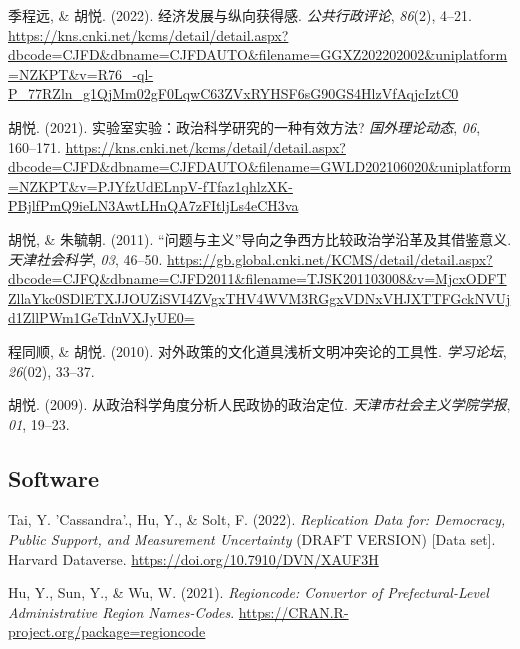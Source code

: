 \documentclass[11pt,a4paper,]{awesome-cv}
\begin{document}
\hypertarget{bibliography}{}
\leavevmode{}%
季程远, \& 胡悦. (2022). 经济发展与纵向获得感. \emph{公共行政评论},
\emph{86}(2), 4--21.
\url{https://kns.cnki.net/kcms/detail/detail.aspx?dbcode=CJFD\&dbname=CJFDAUTO\&filename=GGXZ202202002\&uniplatform=NZKPT\&v=R76_-ql-P_77RZln_g1QjMm02gF0LqwC63ZVxRYHSF6sG90GS4HlzVfAqjcIztC0}

\leavevmode{}%
胡悦. (2021). 实验室实验：政治科学研究的一种有效方法?
\emph{国外理论动态}, \emph{06}, 160--171.
\url{https://kns.cnki.net/kcms/detail/detail.aspx?dbcode=CJFD\&dbname=CJFDAUTO\&filename=GWLD202106020\&uniplatform=NZKPT\&v=PJYfzUdELnpV-fTfaz1qhlzXK-PBjlfPmQ9ieLN3AwtLHnQA7zFItljLs4eCH3va}

\leavevmode{}%
胡悦, \& 朱毓朝. (2011).
{``问题与主义''}导向之争西方比较政治学沿革及其借鉴意义.
\emph{天津社会科学}, \emph{03}, 46--50.
\url{https://gb.global.cnki.net/KCMS/detail/detail.aspx?dbcode=CJFQ\&dbname=CJFD2011\&filename=TJSK201103008\&v=MjcxODFTZllaYkc0SDlETXJJOUZiSVI4ZVgxTHV4WVM3RGgxVDNxVHJXTTFGckNVUjd1ZllPWm1GeTdnVXJyUE0=}

\leavevmode{}%
程同顺, \& 胡悦. (2010). 对外政策的文化道具浅析文明冲突论的工具性.
\emph{学习论坛}, \emph{26}(02), 33--37.

\leavevmode{}%
胡悦. (2009). 从政治科学角度分析人民政协的政治定位.
\emph{天津市社会主义学院学报}, \emph{01}, 19--23.

\endgroup

\hypertarget{software}{%
\subsection{Software}\label{software}}

\begingroup
\setlength{\parindent}{-0.5in}
\setlength{\leftskip}{0.5in}

\hypertarget{bibliography}{}
\leavevmode{}%
Tai, Y. 'Cassandra'., Hu, Y., \& Solt, F. (2022). \emph{Replication Data
for: Democracy, Public Support, and Measurement Uncertainty} (DRAFT
VERSION) {[}Data set{]}. Harvard Dataverse.
\url{https://doi.org/10.7910/DVN/XAUF3H}

\leavevmode{}%
Hu, Y., Sun, Y., \& Wu, W. (2021). \emph{Regioncode: Convertor of
Prefectural-Level Administrative Region Names-Codes}.
\url{https://CRAN.R-project.org/package=regioncode}
\end{document}
